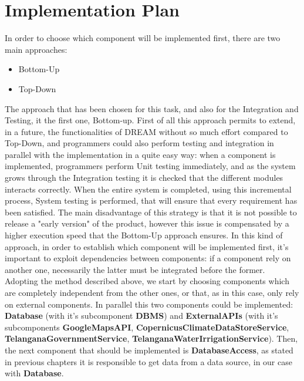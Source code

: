 \section{Implementation Plan}

In order to choose which component will be implemented first, there are two main approaches:
\begin{itemize}
    \item Bottom-Up
    \item Top-Down 
\end{itemize}
The approach that has been chosen for this task, and also for the Integration and Testing, it the first one, Bottom-up.
First of all this approach permits to extend, in a future, the functionalities of DREAM without so much effort compared to Top-Down, and programmers could also perform testing and integration in parallel with the implementation in a quite easy way: when a component is implemented, programmers perform Unit testing immediately, and as the system grows through the Integration testing it is checked that the different modules interacts correctly. When the entire system is completed, using this incremental process, System testing is performed, that will ensure that every requirement has been satisfied.\newline
The main disadvantage of this strategy is that it is not possible to release a "early version" of the product, however this issue is compensated by a higher execution speed that the Bottom-Up approach ensures.
In this kind of approach, in order to establish which component will be implemented first, it's important to exploit dependencies between components: if a component rely on another one, necessarily the latter must be integrated before the former.
Adopting the method described above, we start by choosing components which are completely independent from the other ones, or that, as in this case, only rely on external components.\newline
In parallel this two components could be implemented: \textbf{Database} (with it's subcomponent \textbf{DBMS}) and \textbf{ExternalAPIs} (with it's subcomponents \textbf{GoogleMapsAPI}, \textbf{CopernicusClimateDataStoreService}, \textbf{TelanganaGovernmentService}, \textbf{TelanganaWaterIrrigationService}).\newline
Then, the next component that should be implemented is \textbf{DatabaseAccess}, as stated in previous chapters it is responsible to get data from a data source, in our case with \textbf{Database}.\newline
